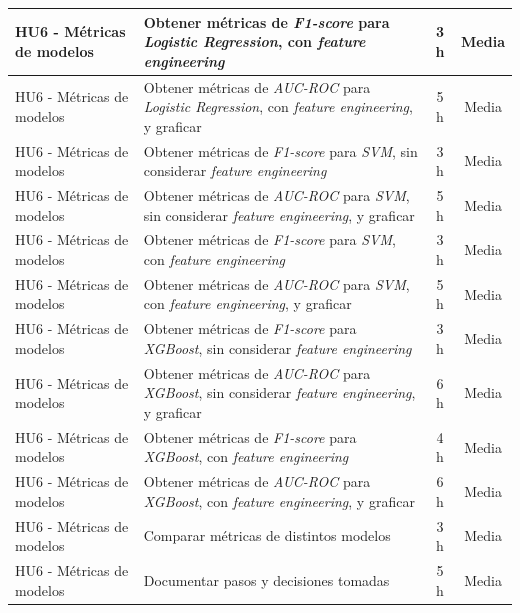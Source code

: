 \documentclass[
11pt, %
]{charter}
\begin{document}
\begin{xltabular}{\linewidth}{@{}|X|X|c|c|@{}}
HU6 - Métricas de modelos & Obtener métricas de \textit{F1-score} para \textit{Logistic Regression}, con \textit{feature engineering} & 3 h & Media \\ \hline
HU6 - Métricas de modelos & Obtener métricas de \textit{AUC-ROC} para \textit{Logistic Regression}, con \textit{feature engineering}, y graficar & 5 h & Media \\ \hline
HU6 - Métricas de modelos & Obtener métricas de \textit{F1-score} para \textit{SVM}, sin  considerar \textit{feature engineering} & 3 h & Media \\ \hline
HU6 - Métricas de modelos & Obtener métricas de \textit{AUC-ROC} para \textit{SVM}, sin  considerar \textit{feature engineering}, y graficar & 5 h & Media \\ \hline
HU6 - Métricas de modelos & Obtener métricas de \textit{F1-score} para \textit{SVM}, con \textit{feature engineering} & 3 h & Media \\ \hline
HU6 - Métricas de modelos & Obtener métricas de \textit{AUC-ROC} para \textit{SVM}, con \textit{feature engineering}, y graficar & 5 h & Media \\ \hline
HU6 - Métricas de modelos & Obtener métricas de \textit{F1-score} para \textit{XGBoost}, sin  considerar \textit{feature engineering} & 3 h & Media \\ \hline
HU6 - Métricas de modelos & Obtener métricas de \textit{AUC-ROC} para \textit{XGBoost}, sin  considerar \textit{feature engineering}, y graficar & 6 h & Media \\ \hline
HU6 - Métricas de modelos & Obtener métricas de \textit{F1-score} para \textit{XGBoost}, con \textit{feature engineering} & 4 h & Media \\ \hline
HU6 - Métricas de modelos & Obtener métricas de \textit{AUC-ROC} para \textit{XGBoost}, con \textit{feature engineering}, y graficar & 6 h & Media \\ \hline
HU6 - Métricas de modelos & Comparar métricas de distintos modelos & 3 h & Media \\ \hline
HU6 - Métricas de modelos & Documentar pasos y decisiones tomadas & 5 h & Media \\ \hline


\end{xltabular}
\end{document}
